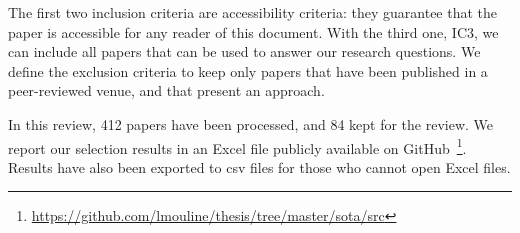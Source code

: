 The first two inclusion criteria are accessibility criteria: they guarantee that the paper is accessible for any reader of this document.
With the third one, IC3, we can include all papers that can be used to answer our research questions.
We define the exclusion criteria to keep only papers that have been published in a peer-reviewed venue, and that present an approach.

In this review, 412 papers have been processed, and 84 kept for the review.
We report our selection results in an Excel file publicly available on GitHub~\footnote{\url{https://github.com/lmouline/thesis/tree/master/sota/src}}.
Results have also been exported to \gls{csv} files for those who cannot open Excel files.

